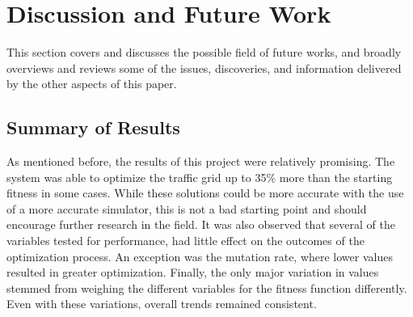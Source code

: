 %
%


\chapter{Discussion and Future Work}\label{ch:conclusion}

This section covers and discusses the possible field of future works, and broadly overviews and reviews some of the issues, discoveries, and information delivered by the other aspects of this paper.

\section{Summary of Results}
As mentioned before, the results of this project were relatively promising.  The system was able to optimize the traffic grid up to 35\% more than the starting fitness in some cases.  While these solutions could be more accurate with the use of a more accurate simulator, this is not a bad starting point and should encourage further research in the field.  It was also observed that several of the variables tested for performance, had little effect on the outcomes of the optimization process.  An exception was the mutation rate, where lower values resulted in greater optimization.  Finally, the only major variation in values stemmed from weighing the different variables for the fitness function differently.  Even with these variations, overall trends remained consistent.

